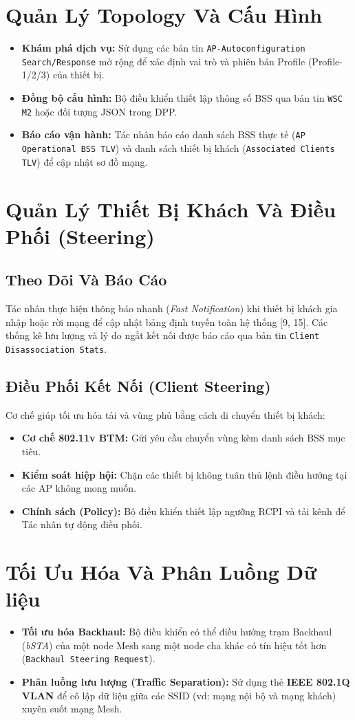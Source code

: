\section{Quản Lý Topology Và Cấu Hình}
\begin{itemize}
	\item \textbf{Khám phá dịch vụ:} Sử dụng các bản tin \texttt{AP-Autoconfiguration Search/Response} mở rộng để xác định vai trò và phiên bản Profile (Profile-1/2/3) của thiết bị.
	\item \textbf{Đồng bộ cấu hình:} Bộ điều khiển thiết lập thông số BSS qua bản tin \texttt{WSC M2} hoặc đối tượng JSON trong DPP.
	\item \textbf{Báo cáo vận hành:} Tác nhân báo cáo danh sách BSS thực tế (\texttt{AP Operational BSS TLV}) và danh sách thiết bị khách (\texttt{Associated Clients TLV}) để cập nhật sơ đồ mạng.
\end{itemize}

\section{Quản Lý Thiết Bị Khách Và Điều Phối (Steering)}
\subsection{Theo Dõi Và Báo Cáo}
Tác nhân thực hiện thông báo nhanh (\textit{Fast Notification}) khi thiết bị khách gia nhập hoặc rời mạng để cập nhật bảng định tuyến toàn hệ thống [9, 15]. Các thống kê lưu lượng và lý do ngắt kết nối được báo cáo qua bản tin \texttt{Client Disassociation Stats}.

\subsection{Điều Phối Kết Nối (Client Steering)}
Cơ chế giúp tối ưu hóa tải và vùng phủ bằng cách di chuyển thiết bị khách:
\begin{itemize}
	\item \textbf{Cơ chế 802.11v BTM:} Gửi yêu cầu chuyển vùng kèm danh sách BSS mục tiêu.
	\item \textbf{Kiểm soát hiệp hội:} Chặn các thiết bị không tuân thủ lệnh điều hướng tại các AP không mong muốn.
	\item \textbf{Chính sách (Policy):} Bộ điều khiển thiết lập ngưỡng RCPI và tải kênh để Tác nhân tự động điều phối.
\end{itemize}

\section{Tối Ưu Hóa Và Phân Luồng Dữ liệu}
\begin{itemize}
	\item \textbf{Tối ưu hóa Backhaul:} Bộ điều khiển có thể điều hướng trạm Backhaul (\textit{bSTA}) của một node Mesh sang một node cha khác có tín hiệu tốt hơn (\texttt{Backhaul Steering Request}).
	\item \textbf{Phân luồng lưu lượng (Traffic Separation):} Sử dụng thẻ \textbf{IEEE 802.1Q VLAN} để cô lập dữ liệu giữa các SSID (vd: mạng nội bộ và mạng khách) xuyên suốt mạng Mesh.
\end{itemize}

